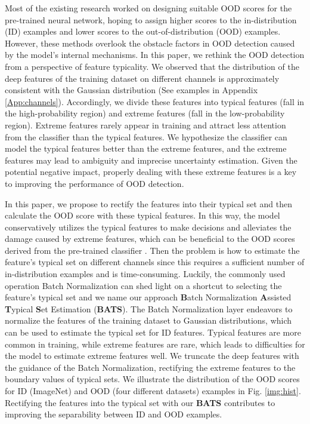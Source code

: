 \documentclass{article}
\begin{document}
Most of the existing research \cite{liu2020energy,hendrycks17baseline,ODIN,thulasidasan2019mixup,papadopoulos2021outlier,Mahalanobis,huang2021importance} worked on designing suitable OOD scores for the pre-trained neural network, hoping to assign higher scores to the in-distribution (ID) examples and lower scores to the out-of-distribution (OOD) examples. However, these methods overlook the obstacle factors in OOD detection caused by the model's internal mechanisms. 
In this paper, we rethink the OOD detection from a perspective of feature typicality. We observed that the distribution of the deep features of the training dataset on different channels is approximately consistent with the Gaussian distribution (See examples in Appendix \ref{App:channels}). 
Accordingly, we divide these features into typical features (fall in the high-probability region) and extreme features (fall in the low-probability region).
Extreme features rarely appear in training and attract less attention from the classifier than the typical features. We hypothesize the classifier can model the typical features better than the extreme features, and the extreme features may lead to ambiguity and imprecise uncertainty estimation.
Given the potential negative impact, properly dealing with these extreme features is a key to improving the performance of OOD detection.

In this paper, we propose to rectify the features into their typical set and then calculate the OOD score with these typical features. In this way, the model conservatively utilizes the typical features to make decisions and alleviates the damage caused by extreme features, which can be beneficial to the OOD scores derived from the pre-trained classifier \cite{liu2020energy,hendrycks17baseline,ODIN,huang2021importance}. Then the problem is how to estimate the feature's typical set on different channels since this requires a sufficient number of in-distribution examples and is time-consuming. Luckily, the commonly used operation Batch Normalization can shed light on a shortcut to selecting the feature's typical set and we name our approach \textbf{B}atch Normalization \textbf{A}ssisted \textbf{T}ypical \textbf{S}et Estimation (\textbf{BATS}). The Batch Normalization layer endeavors to normalize the features of the training dataset to Gaussian distributions, which can be used to estimate the typical set for ID features. Typical features are more common in training, while extreme features are rare, which leads to difficulties for the model to estimate extreme features well. We truncate the deep features with the guidance of the Batch Normalization, rectifying the extreme features to the boundary values of typical sets. We illustrate the distribution of the OOD scores for ID (ImageNet) and OOD (four different datasets) examples in Fig. \ref{img:hist}. 
Rectifying the features into the typical set with our \textbf{BATS} contributes to improving the separability between ID and OOD examples. 
\end{document}
